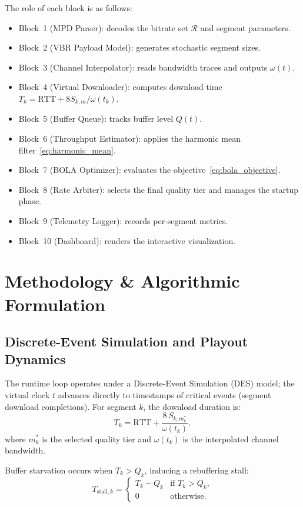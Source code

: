 \documentclass[conference]{IEEEtran}
\begin{document}
The role of each block is as follows:
\begin{itemize}
  \item Block~1 (MPD Parser): decodes the bitrate set $\mathcal{R}$
    and segment parameters.
  \item Block~2 (VBR Payload Model): generates stochastic segment sizes.
  \item Block~3 (Channel Interpolator): reads bandwidth traces and
    outputs $\omega(t)$.
  \item Block~4 (Virtual Downloader): computes download time
    $T_k=\text{RTT}+8S_{k,m}/\omega(t_k)$.
  \item Block~5 (Buffer Queue): tracks buffer level $Q(t)$.
  \item Block~6 (Throughput Estimator): applies the harmonic mean
    filter~\eqref{eq:harmonic_mean}.
  \item Block~7 (BOLA Optimizer): evaluates the
    objective~\eqref{eq:bola_objective}.
  \item Block~8 (Rate Arbiter): selects the final quality tier and
    manages the startup phase.
  \item Block~9 (Telemetry Logger): records per-segment metrics.
  \item Block~10 (Dashboard): renders the interactive visualization.
\end{itemize}

\section{Methodology \& Algorithmic Formulation}

\subsection{Discrete-Event Simulation and Playout Dynamics}

The runtime loop operates under a Discrete-Event Simulation (DES) model;
the virtual clock $t$ advances directly to timestamps of critical events
(segment download completions).  For segment $k$, the download duration is:
\begin{equation}
  T_k=\text{RTT}+\frac{8\,S_{k,m_k^*}}{\omega(t_k)},
  \label{eq:download_time}
\end{equation}
where $m_k^*$ is the selected quality tier and $\omega(t_k)$ is the
interpolated channel bandwidth.

Buffer starvation occurs when $T_k>Q_k$, inducing a rebuffering stall:
\begin{equation}
  T_{\text{stall},k}=
  \begin{cases}
    T_k-Q_k & \text{if } T_k>Q_k,\\
    0        & \text{otherwise.}
  \end{cases}
  \label{eq:stall_time}
\end{equation}
\end{document}
